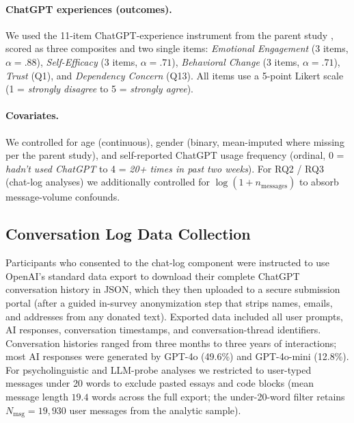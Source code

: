 \documentclass[letterpaper]{article}
\begin{document}
\paragraph{ChatGPT experiences (outcomes).} We used the 11-item ChatGPT-experience instrument from the parent study \citep[Table~3 of][]{anon2026attachment}, scored as three composites and two single items: \emph{Emotional Engagement} (3 items, $\alpha=.88$), \emph{Self-Efficacy} (3 items, $\alpha=.71$), \emph{Behavioral Change} (3 items, $\alpha=.71$), \emph{Trust} (Q1), and \emph{Dependency Concern} (Q13). All items use a 5-point Likert scale (1 = \emph{strongly disagree} to 5 = \emph{strongly agree}).

\paragraph{Covariates.} We controlled for age (continuous), gender (binary, mean-imputed where missing per the parent study), and self-reported ChatGPT usage frequency (ordinal, 0 = \emph{hadn't used ChatGPT} to 4 = \emph{20+ times in past two weeks}). For RQ2 / RQ3 (chat-log analyses) we additionally controlled for $\log(1 + n_\mathrm{messages})$ to absorb message-volume confounds.

\subsection{Conversation Log Data Collection}
Participants who consented to the chat-log component were instructed to use OpenAI's standard data export to download their complete ChatGPT conversation history in JSON, which they then uploaded to a secure submission portal (after a guided in-survey anonymization step that strips names, emails, and addresses from any donated text). Exported data included all user prompts, AI responses, conversation timestamps, and conversation-thread identifiers. Conversation histories ranged from three months to three years of interactions; most AI responses were generated by GPT-4o (49.6\%) and GPT-4o-mini (12.8\%). For psycholinguistic and LLM-probe analyses we restricted to user-typed messages under 20 words to exclude pasted essays and code blocks (mean message length $19.4$ words across the full export; the under-20-word filter retains $N_{\mathrm{msg}}=19{,}930$ user messages from the analytic sample).
\end{document}
